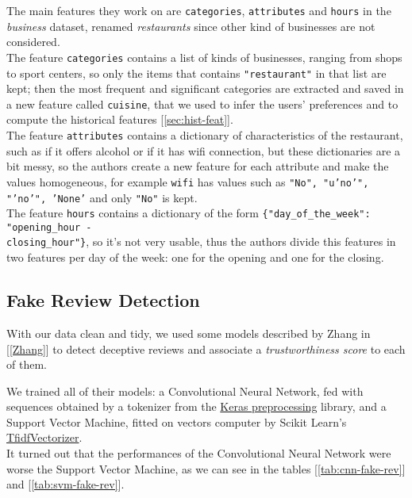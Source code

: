 The main features they work on are \texttt{categories}, \texttt{attributes} and \texttt{hours} in the \textit{business} dataset, renamed \textit{restaurants} since other kind of businesses are not considered.\\
The feature \texttt{categories} contains a list of kinds of businesses, ranging from shops to sport centers, so only the items that contains \texttt{"restaurant"} in that list are kept; then the most frequent and significant categories are extracted and saved in a new feature called \texttt{cuisine}, that we used to infer the users' preferences and to compute the historical features [\ref{sec:hist-feat}].\\
The feature \texttt{attributes} contains a dictionary of characteristics of the restaurant, such as if it offers alcohol or if it has wifi connection, but these dictionaries are a bit messy, so the authors create a new feature for each attribute and make the values homogeneous, for example \texttt{wifi} has values such as \texttt{"No", "u'no'", "'no'", 'None'} and only \texttt{"No"} is kept.\\
The feature \texttt{hours} contains a dictionary of the form \texttt{\{"day\_of\_the\_week": "opening\_hour -\\ closing\_hour"\}}, so it's not very usable, thus the authors divide this features in two features per day of the week: one for the opening and one for the closing.


\subsection{Fake Review Detection} \label{sec:fake-rev}

With our data clean and tidy, we used some models described by Zhang in [\ref{Zhang}] to detect deceptive reviews and associate a \textit{trustworthiness score} to each of them.

We trained all of their models: a Convolutional Neural Network, fed with sequences obtained by a tokenizer from the \href{https://keras.io/preprocessing/text/}{Keras preprocessing} library, and a Support Vector Machine, fitted on vectors computer by Scikit Learn's \href{https://scikit-learn.org/stable/modules/generated/sklearn.feature_extraction.text.TfidfVectorizer.html}{TfidfVectorizer}.\\
It turned out that the performances of the Convolutional Neural Network were worse \wrt the Support Vector Machine, as we can see in the tables [\ref{tab:cnn-fake-rev}] and [\ref{tab:svm-fake-rev}].

